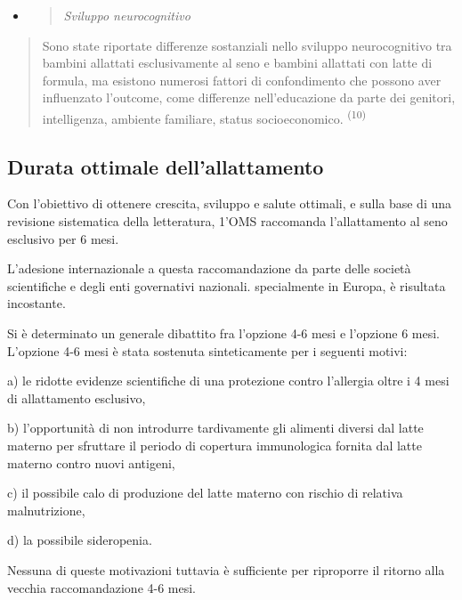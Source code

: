 \documentclass[]{article}
\begin{document}
\begin{itemize}
\item
  \begin{quote}
  \emph{Sviluppo neurocognitivo }
  \end{quote}
\end{itemize}

\begin{quote}
Sono state riportate differenze sostanziali nello sviluppo
neurocognitivo tra bambini allattati esclusivamente al seno e bambini
allattati con latte di formula, ma esistono numerosi fattori di
confondimento che possono aver influenzato l'outcome, come differenze
nell'educazione da parte dei genitori, intelligenza, ambiente familiare,
status socioeconomico. \textsuperscript{(10) }
\end{quote}

\hypertarget{durata-ottimale-dellallattamento}{%
\subsection{Durata ottimale
dell'allattamento}\label{durata-ottimale-dellallattamento}}

Con l'obiettivo di ottenere crescita, sviluppo e salute ottimali, e
sulla base di una revisione sistematica della letteratura, 1'OMS
raccomanda l'allattamento al seno esclusivo per 6 mesi.

L'adesione internazionale a questa raccomandazione da parte delle
società scientifiche e degli enti governativi nazionali. specialmente in
Europa, è risultata incostante.

Si è determinato un generale dibattito fra l'opzione 4-6 mesi e
l'opzione 6 mesi. L'opzione 4-6 mesi è stata sostenuta sinteticamente
per i seguenti motivi:

a) le ridotte evidenze scientifiche di una protezione contro l'allergia
oltre i 4 mesi di allattamento esclusivo,

b) l'opportunità di non introdurre tardivamente gli alimenti diversi dal
latte materno per sfruttare il periodo di copertura immunologica fornita
dal latte materno contro nuovi antigeni,

c) il possibile calo di produzione del latte materno con rischio di
relativa malnutrizione,

d) la possibile sideropenia.

Nessuna di queste motivazioni tuttavia è sufficiente per riproporre il
ritorno alla vecchia raccomandazione 4-6 mesi.
\end{document}
